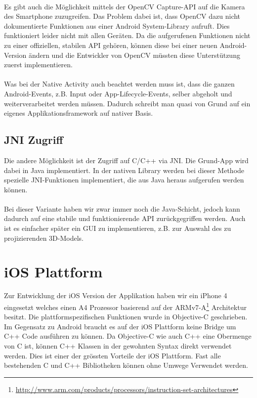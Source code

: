 \paragraph{}
Es gibt auch die Möglichkeit mittels der OpenCV Capture-API auf die Kamera des Smartphone zuzugreifen. Das Problem dabei ist, dass OpenCV dazu nicht dokumentierte Funktionen aus einer Android System-Library aufruft. Dies funktioniert leider nicht mit allen Geräten. Da die aufgerufenen Funktionen nicht zu einer offiziellen, stabilen API gehören, können diese bei einer neuen Android-Version ändern und die Entwickler von OpenCV müssten diese Unterstützung zuerst implementieren.

\paragraph{}
Was bei der Native Activity auch beachtet werden muss ist, dass die ganzen Android-Events, z.B. Input oder App-Lifecycle-Events, selber abgeholt und weiterverarbeitet werden müssen. Dadurch schreibt man quasi von Grund auf ein eigenes Applikationsframework auf nativer Basis.


\subsection{JNI Zugriff}
Die andere Möglichkeit ist der Zugriff auf C/C++ via JNI. Die Grund-App wird dabei in Java implementiert. In der nativen Library werden bei dieser Methode spezielle JNI-Funktionen implementiert, die aus Java heraus aufgerufen werden können.

\paragraph{}
Bei dieser Variante haben wir zwar immer noch die Java-Schicht, jedoch kann dadurch auf eine stabile und funktionierende API zurückgegriffen werden. Auch ist es einfacher später ein GUI zu implementieren, z.B. zur Auswahl des zu projizierenden 3D-Models.


\section{iOS Plattform}
Zur Entwicklung der iOS Version der Applikation haben wir ein iPhone 4 eingesetzt welches einen A4 Prozessor basierend auf der ARMv7-A\footnote{\url{http://www.arm.com/products/processors/instruction-set-architectures}} Architektur besitzt. Die plattformspezifischen Funktionen wurde in Objective-C geschrieben. Im Gegensatz zu Android braucht es auf der iOS Plattform keine Bridge um C++ Code ausführen zu können. Da Objective-C wie auch C++ eine Obermenge von C ist, können C++ Klassen in der gewohnten Syntax direkt verwendet werden. Dies ist einer der grössten Vorteile der iOS Plattform. Fast alle bestehenden C und C++ Bibliotheken können ohne Umwege Verwendet werden.


